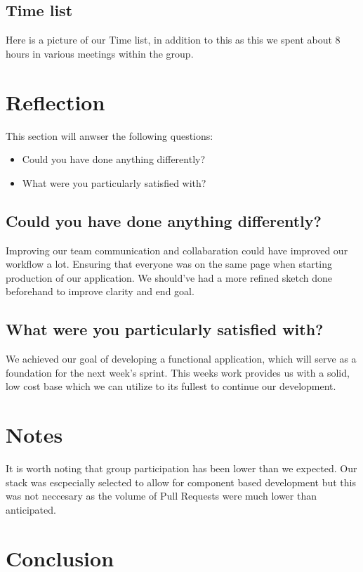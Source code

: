 \documentclass[12pt]{article}
\begin{document}
\subsection{Time list}

Here is a picture of our Time list, in addition to this as this we spent about 8 hours in various meetings within the group.

\section{Reflection}
This section will anwser the following questions:
\begin{itemize}
    \item Could you have done anything differently?
    \item What were you particularly satisfied with?
\end{itemize}

\subsection{Could you have done anything differently?}
Improving our team communication and collabaration could have improved our workflow a lot. Ensuring that everyone was on the 
same page when starting production of our application. We should've had a more refined sketch done beforehand to improve 
clarity and end goal.

\subsection{What were you particularly satisfied with?}
We achieved our goal of developing a functional application, which will serve as a foundation for the next week's sprint. 
This weeks work provides us with a solid, low cost base which we can utilize to its fullest to continue our development.

\section{Notes}
It is worth noting that group participation has been lower than we expected.
Our stack was escpecially selected to allow for component based development but this was not neccesary
as the volume of Pull Requests were much lower than anticipated.

\section{Conclusion}

\printbibliography
\end{document}
